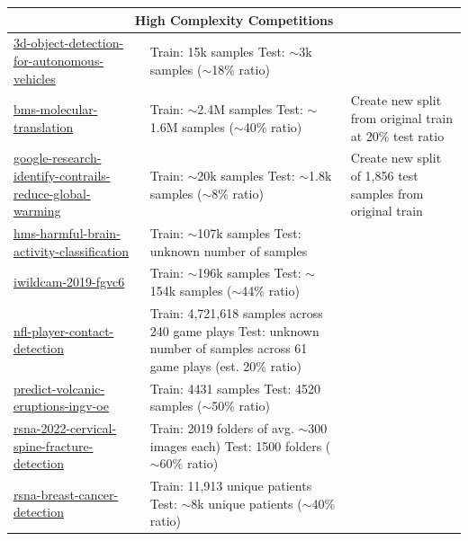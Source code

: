 \documentclass{article} %
\begin{document}
\begin{longtable}{m{4cm} m{4.5cm} m{4cm}}
    \midrule
    \multicolumn{3}{c}{\textbf{High Complexity Competitions}} \\
    \midrule
    \href{https://www.kaggle.com/c/3d-object-detection-for-autonomous-vehicles}{3d-object-detection-for-autonomous-vehicles} &  Train: 15k samples \newline  Test: $\sim$3k samples ($\sim$18\% ratio) & \\
    \href{https://www.kaggle.com/c/bms-molecular-translation}{bms-molecular-translation} &  Train: $\sim$2.4M samples \newline  Test: $\sim$1.6M samples ($\sim$40\% ratio) & Create new split from original train at 20\% test ratio \\
    \href{https://www.kaggle.com/c/google-research-identify-contrails-reduce-global-warming}{google-research-identify-contrails-reduce-global-warming} &  Train: $\sim$20k samples \newline  Test: $\sim$1.8k samples ($\sim$8\% ratio) & Create new split of 1,856 test samples from original train \\
    \href{https://www.kaggle.com/c/hms-harmful-brain-activity-classification}{hms-harmful-brain-activity-classification} &  Train: $\sim$107k samples \newline  Test: unknown number of samples & \\
    \href{https://www.kaggle.com/c/iwildcam-2019-fgvc6}{iwildcam-2019-fgvc6} &  Train: $\sim$196k samples \newline  Test: $\sim$154k samples ($\sim$44\% ratio) & \\
    \href{https://www.kaggle.com/c/nfl-player-contact-detection}{nfl-player-contact-detection} &  Train: 4,721,618 samples across 240 game plays \newline  Test: unknown number of samples across 61 game plays (est. 20\% ratio) & \\
    \href{https://www.kaggle.com/c/predict-volcanic-eruptions-ingv-oe}{predict-volcanic-eruptions-ingv-oe} &  Train: 4431 samples \newline  Test: 4520 samples ($\sim$50\% ratio) & \\
    \href{https://www.kaggle.com/c/rsna-2022-cervical-spine-fracture-detection}{rsna-2022-cervical-spine-fracture-detection} &  Train: 2019 folders of avg. $\sim$300 images each) \newline  Test: 1500 folders ($\sim$60\% ratio) & \\
    \href{https://www.kaggle.com/c/rsna-breast-cancer-detection}{rsna-breast-cancer-detection} &  Train: 11,913 unique patients \newline  Test: $\sim$8k unique patients ($\sim$40\% ratio) & \\

\end{longtable}
\end{document}
